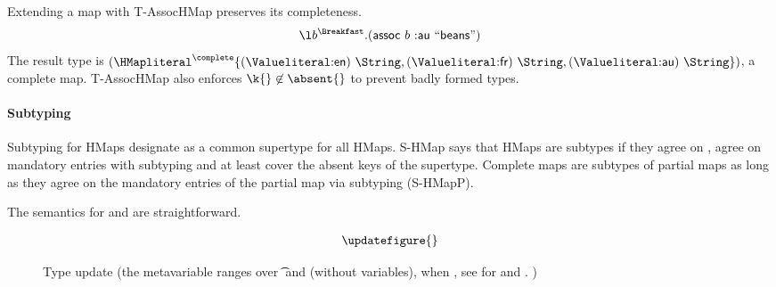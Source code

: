 Extending a map with T-AssocHMap preserves its completeness.
$$
\abs{\makelocal{b}}{\Breakfast}{\assocexp{\makelocal{b}}{\makekw{au}}{\makestr{beans}}}
$$
The result type is
$
\HMapc{\mandatoryset{\mandatoryentrynoarrow{\Valkw{en}}{\String}, {\mandatoryentrynoarrow{\Valkw{fr}}{\String}}
        ,{\mandatoryentrynoarrow{\Valkw{au}}{\String}}}}
$,
a complete map.
T-AssocHMap also enforces ${\k{}} \not\in {\absent{}}$ to prevent badly formed types.


\paragraph{Subtyping}
Subtyping for HMaps
designate \MapLiteral{} as a common supertype for all HMaps.
S-HMap says that HMaps are subtypes if they agree
on \completenessmeta{}, agree on mandatory entries with subtyping
and at least cover the absent keys of the supertype.
Complete maps are subtypes of partial maps
as long as they agree on the mandatory entries of the partial map via subtyping (S-HMapP).



The semantics for \getliteral{} and \assocliteral{} are straightforward.

\begin{figure}[t]
  $$
\begin{array}{llll}
\updatefigure{}
\end{array}
$$
\caption{Type update (the metavariable \propisnotmeta{} ranges over \t{} and \nottype{\t{}} (without variables), 
  \notsubtypein{}{\Nil{}}{\nottype{\t{}}} when \issubtypein{}{\Nil{}}{\t{}}, see
 for \restrictliteral{} and \removeliteral{}.
  )}
\label{main:figure:update}
\end{figure}

